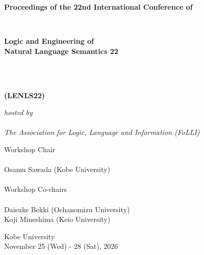 \documentclass[12pt]{ltjarticle}
\begin{document}
\pagestyle{empty}

\vspace*{1cm}

\begin{center}

\begin{Large}
{\bf Proceedings of the 22nd International Conference of}
\end{Large} 
\\
\begin{huge}
{\bf Logic and Engineering of \\
Natural Language Semantics 22} 
\end{huge}
\\\ \\
\begin{huge}
{\bf (LENLS22)}
\end{huge}

\vspace*{1cm}

\begin{Large}
{\em hosted by \\\ \\ The Association for Logic, Language and Information (FoLLI)}
\end{Large}

\begin{large}
\vspace*{1cm}
Workshop Chair\\ $\;$\\
Osamu Sawada (Kobe University) \\
\ \\
Workshop Co-chairs\\ $\;$\\
Daisuke Bekki (Ochanomizu University) \\
Koji Mineshima (Keio University) \\

\end{large}

\vspace*{3cm}


\vspace*{1cm}

\begin{large}
Kobe University \\
November 25 (Wed) - 28 (Sat), 2026
\end{large}
\vfill

\end{center}
\end{document}
